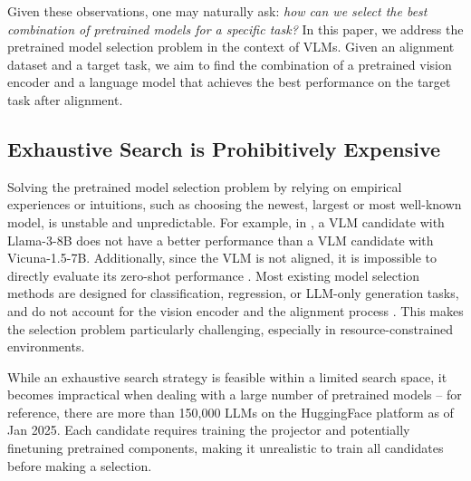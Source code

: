 
Given these observations, one may naturally ask: \emph{how can we select the best combination of pretrained models for a specific task?} 
In this paper, we address the pretrained model selection problem in the context of VLMs. 
Given an alignment dataset and a target task, we aim to find the combination of a pretrained vision encoder and a language model that achieves the best performance on the target task after alignment.   



\subsection{Exhaustive Search is Prohibitively Expensive}


Solving the pretrained model selection problem by relying on empirical experiences or intuitions, such as choosing the newest, largest or most well-known model, is unstable and unpredictable. For example, in , a VLM candidate with Llama-3-8B does not have a better performance than a VLM candidate with Vicuna-1.5-7B.
Additionally, since the VLM is not aligned, it is impossible to directly evaluate its zero-shot performance \cite{brown2020language}. 
Most existing model selection methods are designed for classification, regression, or LLM-only generation tasks, and do not account for the vision encoder and the alignment process \cite{vu2020exploring,you2021logme,lin2024selecting}. 
This makes the selection problem particularly challenging, especially in resource-constrained environments.

While an exhaustive search strategy is feasible within a limited search space, it becomes impractical when dealing with a large number of pretrained models -- for reference, there are more than 150,000 LLMs on the HuggingFace platform as of Jan 2025.
Each candidate requires training the projector and potentially finetuning pretrained components, making it unrealistic to train all candidates before making a selection. 



